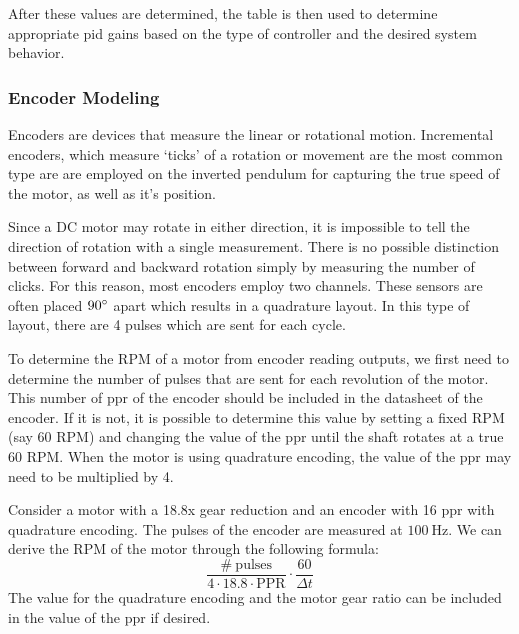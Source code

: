 After these values are determined, the table is then used to determine appropriate \gls{pid} gains based on the type of controller and the desired system behavior. 

\begin{example}

    
\end{example}

\subsubsection{Encoder Modeling}
Encoders are devices that measure the linear or rotational motion. Incremental encoders, which measure `ticks' of a rotation or movement are the most common type are are employed on the inverted pendulum for capturing the true speed of the motor, as well as it's position.

Since a DC motor may rotate in either direction, it is impossible to tell the direction of rotation with a single measurement. There is no possible distinction between forward and backward rotation simply by measuring the number of clicks. For this reason, most encoders employ two channels. These sensors are often placed $90\degree$ apart which results in a quadrature layout. In this type of layout, there are 4 pulses which are sent for each cycle.

\begin{example}
    To determine the RPM of a motor from encoder reading outputs, we first need to determine the number of pulses that are sent for each revolution of the motor. This number of \gls{ppr} of the encoder should be included in the datasheet of the encoder. If it is not, it is possible to determine this value by setting a fixed RPM (say 60 RPM) and changing the value of the \gls{ppr} until the shaft rotates at a true 60 RPM. When the motor is using quadrature encoding, the value of the \gls{ppr} may need to be multiplied by 4.

    Consider a motor with a 18.8x gear reduction and an encoder with 16 \gls{ppr} with quadrature encoding. The pulses of the encoder are measured at $100 \ \mathrm{Hz}$. We can derive the RPM of the motor through the following formula:
$$\frac{\mathrm{\# \ pulses}}{4\cdot18.8\cdot\mathrm{PPR}} \cdot \frac{60}{\Delta t}$$
The value for the quadrature encoding and the motor gear ratio can be included in the value of the \gls{ppr} if desired.
\end{example}


